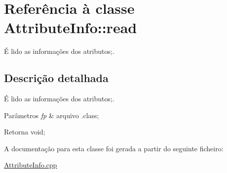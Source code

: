 \hypertarget{class_attribute_info_1_1read}{}\section{Referência à classe Attribute\+Info\+:\+:read}
\label{class_attribute_info_1_1read}


É lido as informações dos atributos;.  




\subsection{Descrição detalhada}
É lido as informações dos atributos;. 


\begin{DoxyParams}{Parâmetros}
{\em fp} & arquivo .class; \\
\hline
\end{DoxyParams}
\begin{DoxyReturn}{Retorna}
void; 
\end{DoxyReturn}


A documentação para esta classe foi gerada a partir do seguinte ficheiro\+:\begin{DoxyCompactItemize}
\item 
\hyperlink{_attribute_info_8cpp}{Attribute\+Info.\+cpp}\end{DoxyCompactItemize}
